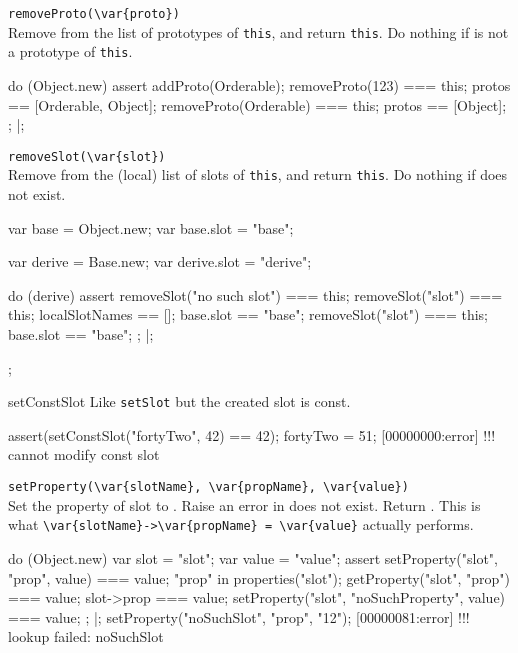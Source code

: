 \begin{urbiscriptapi}
\item \lstinline|removeProto(\var{proto})|\\
  Remove  from the list of prototypes of \lstinline|this|,
  and return \lstinline|this|.  Do nothing if  is not a
  prototype of \lstinline|this|.
\begin{urbiscript}
do (Object.new)
{
  assert
  {
    addProto(Orderable);
    removeProto(123) === this;
    protos == [Orderable, Object];
    removeProto(Orderable) === this;
    protos == [Object];
  };
}|;
\end{urbiscript}

\item \lstinline|removeSlot(\var{slot})|\\
  Remove  from the (local) list of slots of
  \lstinline|this|, and return \lstinline|this|.  Do nothing if
   does not exist.
\begin{urbiscript}
{
  var base = Object.new;
  var base.slot = "base";

  var derive = Base.new;
  var derive.slot = "derive";

  do (derive)
  {
    assert
    {
      removeSlot("no such slot") === this;
      removeSlot("slot") === this;
      localSlotNames == [];
      base.slot == "base";
      removeSlot("slot") === this;
      base.slot == "base";
    };
  }|;
};
\end{urbiscript}


\item[setConstSlot]
  Like \lstinline|setSlot| but the created slot is const.
\begin{urbiscript}
assert(setConstSlot("fortyTwo", 42) == 42);
fortyTwo = 51;
[00000000:error] !!! cannot modify const slot
\end{urbiscript}

\item \lstinline|setProperty(\var{slotName}, \var{propName}, \var{value})|\\
  Set the property  of slot  to
  .  Raise an error in  does not exist.
  Return .  This is what
  \lstinline|\var{slotName}->\var{propName} = \var{value}| actually
  performs.
\begin{urbiscript}
do (Object.new)
{
  var slot = "slot";
  var value = "value";
  assert
  {
    setProperty("slot", "prop", value) === value;
    "prop" in properties("slot");
    getProperty("slot", "prop") === value;
    slot->prop === value;
    setProperty("slot", "noSuchProperty", value) === value;
  };
}|;
setProperty("noSuchSlot", "prop", "12");
[00000081:error] !!! lookup failed: noSuchSlot
\end{urbiscript}



\end{urbiscriptapi}
